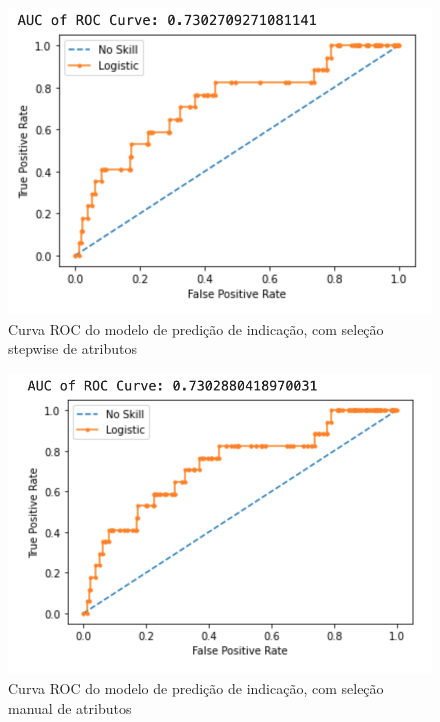         \begin{figure}[htb]
        	\caption{\label{roc1}Curva ROC do modelo de predição de indicação, com seleção stepwise de atributos}
        	\begin{center}
        		\includegraphics[scale=0.7]{roc1.png}
        	\end{center}
        \end{figure}
        
        \begin{figure}[htb]
        	\caption{\label{roc2}Curva ROC do modelo de predição de indicação, com seleção manual de atributos}
        	\begin{center}
        		\includegraphics[scale=0.7]{roc2.png}
        	\end{center}
        \end{figure}
        
